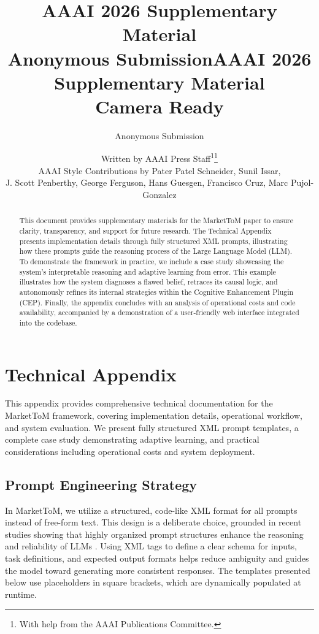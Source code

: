 \documentclass[letterpaper]{article} %
\title{AAAI 2026 Supplementary Material\\Anonymous Submission}
\title{AAAI 2026 Supplementary Material\\Camera Ready}
\author{
    Anonymous Submission
}
\author{
    Written by AAAI Press Staff\textsuperscript{\rm 1}\thanks{With help from the AAAI Publications Committee.}\\
    AAAI Style Contributions by Pater Patel Schneider,
    Sunil Issar,\\
    J. Scott Penberthy,
    George Ferguson,
    Hans Guesgen,
    Francisco Cruz\equalcontrib,
    Marc Pujol-Gonzalez\equalcontrib
}
\begin{document}
\maketitle

\begin{abstract}
This document provides supplementary materials for the MarketToM paper to ensure clarity, transparency, and support for future research. The Technical Appendix presents implementation details through fully structured XML prompts, illustrating how these prompts guide the reasoning process of the Large Language Model (LLM). To demonstrate the framework in practice, we include a case study showcasing the system’s interpretable reasoning and adaptive learning from error. This example illustrates how the system diagnoses a flawed belief, retraces its causal logic, and autonomously refines its internal strategies within the Cognitive Enhancement Plugin (CEP). Finally, the appendix concludes with an analysis of operational costs and code availability, accompanied by a demonstration of a user-friendly web interface integrated into the codebase.
\end{abstract}


\section{Technical Appendix}
This appendix provides comprehensive technical documentation for the MarketToM framework, covering implementation details, operational workflow, and system evaluation. We present fully structured XML prompt templates, a complete case study demonstrating adaptive learning, and practical considerations including operational costs and system deployment.


\subsection{Prompt Engineering Strategy}
In MarketToM, we utilize a structured, code-like XML format for all prompts instead of free-form text. This design is a deliberate choice, grounded in recent studies showing that highly organized prompt structures enhance the reasoning and reliability of LLMs \cite{puerto2024code, he2024does, mishra2023prompting}. Using XML tags to define a clear schema for inputs, task definitions, and expected output formats helps reduce ambiguity and guides the model toward generating more consistent responses. The templates presented below use placeholders in square brackets, which are dynamically populated at runtime.
\end{document}
